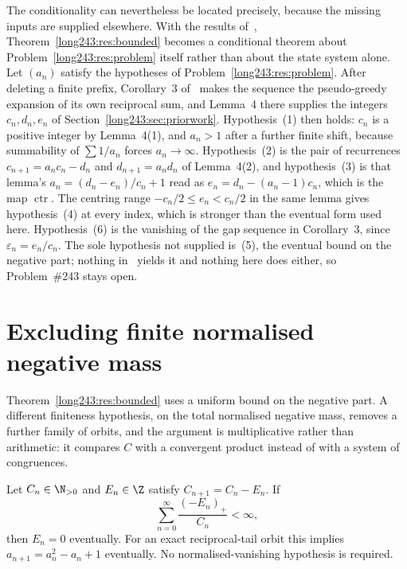 \documentclass[11pt]{article}
\newcommand{\ctr}{\operatorname{ctr}}
\begin{document}
The conditionality can nevertheless be located precisely, because the missing
inputs are supplied elsewhere.  With the results of~\cite{koizumi2025},
Theorem~\ref{long243:res:bounded} becomes a conditional theorem about
Problem~\ref{long243:res:problem} itself rather than about the state system alone.  Let
$(a_n)$ satisfy the hypotheses of Problem~\ref{long243:res:problem}.  After deleting a
finite prefix, Corollary~3 of~\cite[p.~9]{koizumi2025} makes the sequence the
pseudo-greedy expansion of its own reciprocal sum, and Lemma~4 there supplies
the integers $c_n,d_n,e_n$ of Section~\ref{long243:sec:priorwork}.  Hypothesis~(1) then
holds: $c_n$ is a positive integer by Lemma~4(1), and $a_n>1$ after a further
finite shift, because summability of $\sum1/a_n$ forces $a_n\to\infty$.
Hypothesis~(2) is the pair of recurrences $c_{n+1}=a_nc_n-d_n$ and
$d_{n+1}=a_nd_n$ of Lemma~4(2), and hypothesis~(3) is that lemma's
$a_n=(d_n-e_n)/c_n+1$ read as $e_n=d_n-(a_n-1)c_n$, which is the map $\ctr$.
The centring range $-c_n/2\le e_n<c_n/2$ in the same lemma gives
hypothesis~(4) at every index, which is stronger than the eventual form used
here.  Hypothesis~(6) is the vanishing
of the gap sequence in Corollary~3, since $\varepsilon_n=e_n/c_n$.  The sole
hypothesis not supplied is~(5), the eventual bound on the negative part;
nothing in~\cite{koizumi2025} yields it and nothing here does either, so
Problem~\#243 stays open.

\section{Excluding finite normalised negative mass}\label{long243:sec:mass}

Theorem~\ref{long243:res:bounded} uses a uniform bound on the negative part.  A
different finiteness hypothesis, on the total normalised negative mass, removes
a further family of orbits, and the argument is multiplicative rather than
arithmetic: it compares $C$ with a convergent product instead of with a system
of congruences.

\begin{theorem}\label{long243:res:mass}
Let \(C_n\in\N_{>0}\) and \(E_n\in\Z\) satisfy \(C_{n+1}=C_n-E_n\).
If
\[
 \sum_{n=0}^{\infty}\frac{(-E_n)_+}{C_n}<\infty,
\]
then \(E_n=0\) eventually. For an exact reciprocal-tail orbit this implies
\(a_{n+1}=a_n^2-a_n+1\) eventually. No normalised-vanishing hypothesis is required.
\end{theorem}
\end{document}
